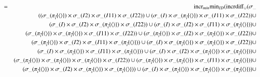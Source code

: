 \begin{eqnarray*}
&=& \algincr_{min} \algmin_{ID} (\algincrdiff_{\cup} (\sigma_{ \dots} \\ &&(
(\sigma_{\dots}( \pi_{\vec{i}} \{\tuple{} \} ) \times   \sigma_{\dots}(I2) \times   \sigma_{\dots}(I11) \times   \sigma_{\dots}(I22)) \cup 
(\sigma_{\dots}(I) \times   \sigma_{\dots}( \pi_{\vec{i}} \{\tuple{} \} ) \times   \sigma_{\dots}(I11) \times   \sigma_{\dots}(I22)) \cup \\
&&(\sigma_{\dots}(I) \times   \sigma_{\dots}(I2) \times  \sigma_{\dots}( \pi_{\vec{i}} \{\tuple{} \}) \times   \sigma_{\dots}(I22)) \cup 
(\sigma_{\dots}(I) \times   \sigma_{\dots}(I2) \times   \sigma_{\dots}(I11) \times  \sigma_{\dots}( \pi_{\vec{i}} \{\tuple{} \} )) \cup \\
&&(\sigma_{\dots}( \pi_{\vec{i}} \{\tuple{} \} ) \times  \sigma_{\dots}( \pi_{\vec{i}} \{\tuple{} \} ) \times   \sigma_{\dots}(I11) \times   \sigma_{\dots}(I22)) \cup 
(\sigma_{\dots}( \pi_{\vec{i}} \{\tuple{} \} ) \times   \sigma_{\dots}(I2) \times  \sigma_{\dots}( \pi_{\vec{i}} \{\tuple{} \} ) \times   \sigma_{\dots}(I22)) \cup \\
&&(\sigma_{\dots}( \pi_{\vec{i}} \{\tuple{} \} ) \times   \sigma_{\dots}(I2) \times   \sigma_{\dots}(I11) \times  \sigma_{\dots}( \pi_{\vec{i}} \{\tuple{} \} )) \cup 
(\sigma_{\dots}(I) \times  \sigma_{\dots}( \pi_{\vec{i}} \{\tuple{} \} ) \times  \sigma_{\dots}( \pi_{\vec{i}} \{\tuple{} \} ) \times   \sigma_{\dots}(I22)) \cup \\
&&(\sigma_{\dots}(I) \times  \sigma_{\dots}( \pi_{\vec{i}} \{\tuple{} \} ) \times   \sigma_{\dots}(I11) \times  \sigma_{\dots}( \pi_{\vec{i}} \{\tuple{} \} )) \cup 
(\sigma_{\dots}(I) \times   \sigma_{\dots}(I2) \times  \sigma_{\dots}( \pi_{\vec{i}} \{\tuple{} \} ) \times  \sigma_{\dots}( \pi_{\vec{i}} \{\tuple{} \} )) \cup \\
&&(\sigma_{\dots}( \pi_{\vec{i}} \{\tuple{} \} ) \times  \sigma_{\dots}( \pi_{\vec{i}} \{\tuple{} \} ) \times  \sigma_{\dots}( \pi_{\vec{i}} \{\tuple{} \} ) \times   \sigma_{\dots}(I22)) \cup 
(\sigma_{\dots}( \pi_{\vec{i}} \{\tuple{} \} ) \times   \sigma_{\dots}( \pi_{\vec{i}} \{\tuple{} \}) \times  \sigma_{\dots}(I11) \times  \sigma_{\dots}( \pi_{\vec{i}} \{\tuple{} \} )) \cup \\
&&(\sigma_{\dots}( \pi_{\vec{i}} \{\tuple{} \} ) \times   \sigma_{\dots}(I2) \times  \sigma_{\dots}( \pi_{\vec{i}} \{\tuple{} \} ) \times  \sigma_{\dots}( \pi_{\vec{i}} \{\tuple{} \} )) \cup 
(\sigma_{\dots}(I) \times  \sigma_{\dots}( \pi_{\vec{i}} \{\tuple{} \} ) \times  \sigma_{\dots}( \pi_{\vec{i}} \{\tuple{} \} ) \times  \sigma_{\dots}( \pi_{\vec{i}} \{\tuple{} \} )) \cup \\

\end{eqnarray*}
